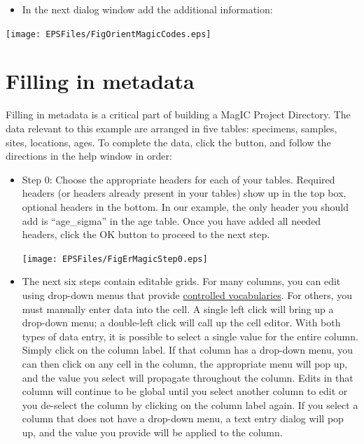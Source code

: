 \documentclass[11pt]{book}
\begin{document}
{\begin{itemize}
\texttt{[image: EPSFiles/FigDemagOrient.eps]}

\begin{itemize}
\item Orientation convention :Pomeroy.
\item Declination correction: Use the IGRF.
\item  Orientation priority: \#1.
\item Put in the number of hours to SUBTRACT from the local time to get to Greenwich Mean Time: -6. [Local time was 6 hours behind GMT for this example.]
\item press the OK button.
\end{itemize}
\item In the next dialog window add the additional information:
\end{itemize}

\texttt{[image: EPSFiles/FigOrientMagicCodes.eps]}

\section{Filling in metadata}

Filling in metadata is a critical part of building a MagIC Project Directory. The data relevant to this example are arranged in five tables: specimens, samples, sites, locations, ages. To complete the data, click the button, and follow the directions in the help window in order:

\begin{itemize}
\item Step 0: Choose the appropriate headers for each of your tables.  Required headers (or headers already present in your tables) show up in the top box, optional headers in the bottom.  In our example, the only header you should add is ``age\_sigma'' in the age table.  Once you have added all needed headers, click the OK button to proceed to the next step.

 \texttt{[image: EPSFiles/FigErMagicStep0.eps]}

 \item The next six steps contain editable grids.  For many columns, you can edit using drop-down menus that provide \href{http://earthref.org/MAGIC/shortlists.htm}{controlled vocabularies}.  For others, you must manually enter data into the cell.  A single left click will bring up a drop-down menu; a double-left click will call up the cell editor.  With both types of data entry, it is possible to select a single value for the entire column. Simply click on the column label.  If that column has a drop-down menu, you can then click on any cell in the column, the appropriate menu will pop up, and the value you select will propagate throughout the column.  Edits in that column will continue to be global until you select another column to edit or you de-select the column by clicking on the column label again.  If you select a column that does not have a drop-down menu, a text entry dialog will pop up, and the value you provide will be applied to the column.


\end{itemize}}
\end{document}
